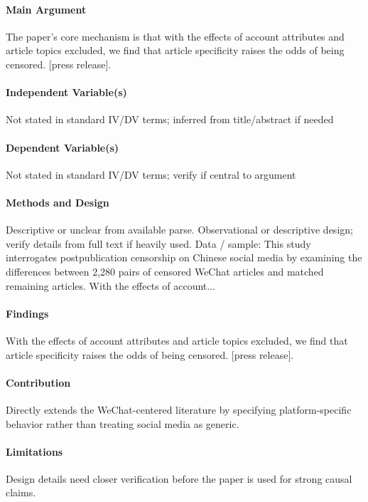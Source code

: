 \documentclass[12pt]{article}
\begin{document}
\paragraph{Main Argument} The paper's core mechanism is that with the effects of account attributes and article topics excluded, we find that article specificity raises the odds of being censored. [press release].

\paragraph{Independent Variable(s)} Not stated in standard IV/DV terms; inferred from title/abstract if needed

\paragraph{Dependent Variable(s)} Not stated in standard IV/DV terms; verify if central to argument

\paragraph{Methods and Design} Descriptive or unclear from available parse. Observational or descriptive design; verify details from full text if heavily used. Data / sample: This study interrogates postpublication censorship on Chinese social media by examining the differences between 2,280 pairs of censored WeChat articles and matched remaining articles. With the effects of account...

\paragraph{Findings} With the effects of account attributes and article topics excluded, we find that article specificity raises the odds of being censored. [press release].

\paragraph{Contribution} Directly extends the WeChat-centered literature by specifying platform-specific behavior rather than treating social media as generic.

\paragraph{Limitations} Design details need closer verification before the paper is used for strong causal claims.
\end{document}
